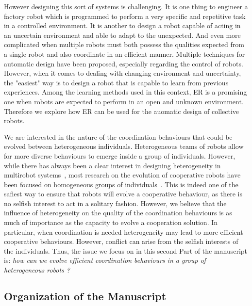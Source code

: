     However designing this sort of systems is challenging. It is one thing to engineer a factory robot which is programmed to perform a very specific and repetitive task in a controlled environment. It is another to design a robot capable of acting in an uncertain environment and able to adapt to the unexpected. And even more complicated when multiple robots must both possess the qualities expected from a single robot and also coordinate in an efficient manner. Multiple techniques for automatic design have been proposed, especially regarding the control of robots. However, when it comes to dealing with changing environment and uncertainty, the "easiest" way is to design a robot that is capable to learn from previous experiences. Among the learning methods used in this context, ER is a promising one when robots are expected to perform in an open and unknown environment. Therefore we explore how ER can be used for the auomatic design of collective robots. 


    We are interested in the nature of the coordination behaviours that could be evolved between heterogeneous individuals. Heterogeneous teams of robots allow for more diverse behaviours to emerge inside a group of individuals. However, while there has always been a clear interest in designing heterogeneity in multirobot systems~\parencite{Parker1994, Parker2008}, most research on the evolution of cooperative robots have been focused on homogeneous groups of individuals~\parencite{Waibel2009}. This is indeed one of the safiest way to ensure that robots will evolve a cooperative behaviour, as there is no selfish interest to act in a solitary fashion. However, we believe that the influence of heterogeneity on the quality of the coordination behaviours is as much of importance as the capacity to evolve a cooperation solution. In particular, when coordination is needed heterogeneity may lead to more efficient cooperative behaviours. However, conflict can arise from the selfish interests of the individuals. Thus, the issue we focus on in this second Part of the manuscript is: \emph{how can we evolve efficient coordination behaviours in a group of heterogeneous robots ?}


  \subsection{Organization of the Manuscript}

